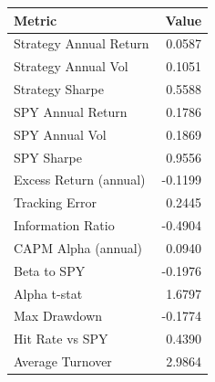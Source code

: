 \begin{tabular}{lr}
\hline
Metric & Value \\
\hline
Strategy Annual Return & 0.0587 \\
Strategy Annual Vol & 0.1051 \\
Strategy Sharpe & 0.5588 \\
SPY Annual Return & 0.1786 \\
SPY Annual Vol & 0.1869 \\
SPY Sharpe & 0.9556 \\
Excess Return (annual) & -0.1199 \\
Tracking Error & 0.2445 \\
Information Ratio & -0.4904 \\
CAPM Alpha (annual) & 0.0940 \\
Beta to SPY & -0.1976 \\
Alpha t-stat & 1.6797 \\
Max Drawdown & -0.1774 \\
Hit Rate vs SPY & 0.4390 \\
Average Turnover & 2.9864 \\
\hline
\end{tabular}